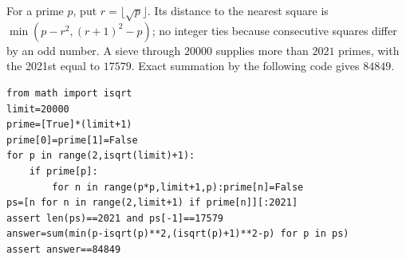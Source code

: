 For a prime $p$, put $r=\lfloor\sqrt p\rfloor$. Its distance to the nearest square is $\min(p-r^2,(r+1)^2-p)$; no integer ties because consecutive squares differ by an odd number. A sieve through $20000$ supplies more than $2021$ primes, with the 2021st equal to $17579$. Exact summation by the following code gives $\boxed{84849}$.\begin{verbatim}
from math import isqrt
limit=20000
prime=[True]*(limit+1)
prime[0]=prime[1]=False
for p in range(2,isqrt(limit)+1):
    if prime[p]:
        for n in range(p*p,limit+1,p):prime[n]=False
ps=[n for n in range(2,limit+1) if prime[n]][:2021]
assert len(ps)==2021 and ps[-1]==17579
answer=sum(min(p-isqrt(p)**2,(isqrt(p)+1)**2-p) for p in ps)
assert answer==84849
\end{verbatim}

